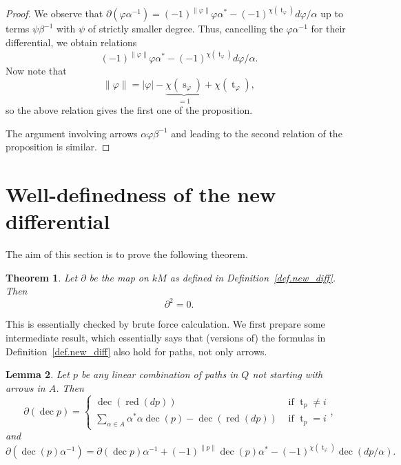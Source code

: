 \documentclass[a4paper,11pt]{amsart}
\newtheorem{theorem}{Theorem}
\newtheorem{lemma}[theorem]{Lemma}
\theoremstyle{definition}
\DeclareMathOperator{\red}{red}
\DeclareMathOperator{\dec}{dec}
\newcommand{\ci}[1]{\chi(#1)}
\newcommand{\st}[1]{\operatorname{s}_{#1}}
\newcommand{\ta}[1]{\operatorname{t}_{#1}}
\numberwithin{theorem}{section}
\begin{document}
\begin{proof}
We observe that $\partial( \varphi \alpha^{-1}) = (-1)^{\| \varphi \|} \varphi \alpha^* - (-1)^{\ci{ \ta{\varphi}}} d \varphi / \alpha$ up to terms $\psi \beta^{-1}$ with $\psi$ of strictly smaller degree. Thus, cancelling the $\varphi \alpha^{-1}$ for their differential, we obtain relations
\[ (-1)^{\| \varphi \|} \varphi \alpha^* - (-1)^{\ci{ \ta{\varphi}}} d \varphi / \alpha. \]
Now note that
\[ \| \varphi \| = |\varphi| - \underbrace{\ci{ \st{\varphi}}}_{=1} + \ci{ \ta{\varphi}}, \]
so the above relation gives the first one of the proposition.

The argument involving arrows $\alpha \varphi \beta^{-1}$ and leading to the second relation of the proposition is similar.
\end{proof}

\section{Well-definedness of the new differential} \label{sec.is_diff}

The aim of this section is to prove the following theorem.

\begin{theorem} \label{thm.is_diff}
Let $\partial$ be the map on $kM$ as defined in Definition~\ref{def.new_diff}. Then
\[ \partial^2 = 0. \]
\end{theorem}

This is essentially checked by brute force calculation. We first prepare some intermediate result, which essentially says that (versions of) the formulas in Definition~\ref{def.new_diff} also hold for paths, not only arrows.

\begin{lemma} Let $p$ be any linear combination of paths in $Q$ not starting with arrows in $A$. Then
\[ \partial( \dec p ) = \begin{cases} \dec ( \red (dp)) & \text{ if } \ta{p} \neq i \\ \sum_{\alpha \in A} \alpha^* \alpha \dec(p) - \dec ( \red (dp)) & \text{ if } \ta{p} = i \end{cases}, \]
and
\[ \partial( \dec(p) \alpha^{-1} ) = \partial( \dec p ) \alpha^{-1} + (-1)^{\| p \|} \dec(p) \alpha^* - (-1)^{\ci{ \ta{\varphi}}} \dec (dp / \alpha). \]
\end{lemma}
\end{document}
